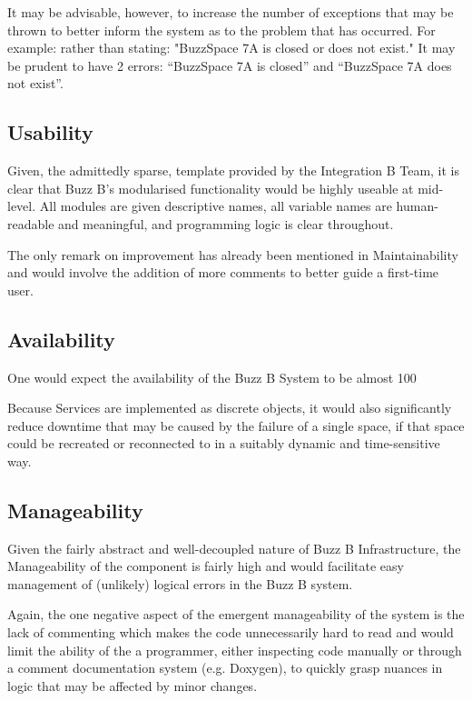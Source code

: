 \documentclass[12pt]{article}
\begin{document}
It may be advisable, however, to increase the number of exceptions that may be thrown to better inform the system as to the problem that has occurred. For example: rather than stating: "BuzzSpace 7A is closed or does not exist." It may be prudent to have 2 errors: “BuzzSpace 7A is closed” and “BuzzSpace 7A does not exist”.


\subsection{Usability}
Given, the admittedly sparse, template provided by the Integration B Team, it is clear that Buzz B’s modularised functionality would be highly useable at mid-level. All modules are given descriptive names, all variable names are human-readable and meaningful, and programming logic is clear throughout. 

The only remark on improvement has already been mentioned in Maintainability and would involve the addition of more comments to better guide a first-time user.

\subsection{Availability}
One would expect the availability of the Buzz B System to be almost 100%

Because Services are implemented as discrete objects, it would also significantly reduce downtime that may be caused by the failure of a single space, if that space could be recreated or reconnected to in a suitably dynamic and time-sensitive way.

\subsection{Manageability}
Given the fairly abstract and well-decoupled nature of Buzz B Infrastructure, the Manageability of the component is fairly high and would facilitate easy management of (unlikely) logical errors in the Buzz B system. 

Again, the one negative aspect of the emergent manageability of the system is the lack of commenting which makes the code unnecessarily hard to read and would limit the ability of the a programmer, either inspecting code manually or through a comment documentation system (e.g. Doxygen), to quickly grasp nuances in logic that may be affected by minor changes.
\end{document}

